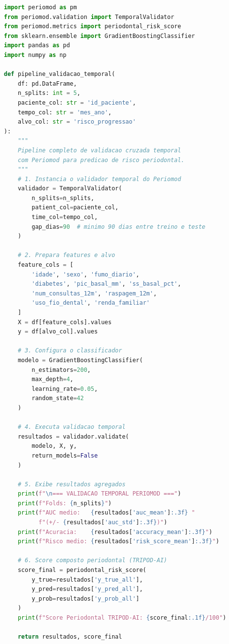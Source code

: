 \begin{lstlisting}[language=Python, caption={Pipeline de validação
cruzada temporal com Periomod},
label={lst:periomod_kfold}]
import periomod as pm
from periomod.validation import TemporalValidator
from periomod.metrics import periodontal_risk_score
from sklearn.ensemble import GradientBoostingClassifier
import pandas as pd
import numpy as np

def pipeline_validacao_temporal(
    df: pd.DataFrame,
    n_splits: int = 5,
    paciente_col: str = 'id_paciente',
    tempo_col: str = 'mes_ano',
    alvo_col: str = 'risco_progressao'
):
    """
    Pipeline completo de validacao cruzada temporal
    com Periomod para predicao de risco periodontal.
    """
    # 1. Instancia o validador temporal do Periomod
    validador = TemporalValidator(
        n_splits=n_splits,
        patient_col=paciente_col,
        time_col=tempo_col,
        gap_dias=90  # minimo 90 dias entre treino e teste
    )
    
    # 2. Prepara features e alvo
    feature_cols = [
        'idade', 'sexo', 'fumo_diario',
        'diabetes', 'pic_basal_mm', 'ss_basal_pct',
        'num_consultas_12m', 'raspagem_12m',
        'uso_fio_dental', 'renda_familiar'
    ]
    X = df[feature_cols].values
    y = df[alvo_col].values
    
    # 3. Configura o classificador
    modelo = GradientBoostingClassifier(
        n_estimators=200,
        max_depth=4,
        learning_rate=0.05,
        random_state=42
    )
    
    # 4. Executa validacao temporal
    resultados = validador.validate(
        modelo, X, y,
        return_models=False
    )
    
    # 5. Exibe resultados agregados
    print(f"\n=== VALIDACAO TEMPORAL PERIOMOD ===")
    print(f"Folds: {n_splits}")
    print(f"AUC medio:   {resultados['auc_mean']:.3f} "
          f"(+/- {resultados['auc_std']:.3f})")
    print(f"Acuracia:    {resultados['accuracy_mean']:.3f}")
    print(f"Risco medio: {resultados['risk_score_mean']:.3f}")
    
    # 6. Score composto periodontal (TRIPOD-AI)
    score_final = periodontal_risk_score(
        y_true=resultados['y_true_all'],
        y_pred=resultados['y_pred_all'],
        y_prob=resultados['y_prob_all']
    )
    print(f"Score Periodontal TRIPOD-AI: {score_final:.1f}/100")
    
    return resultados, score_final
\end{lstlisting}

